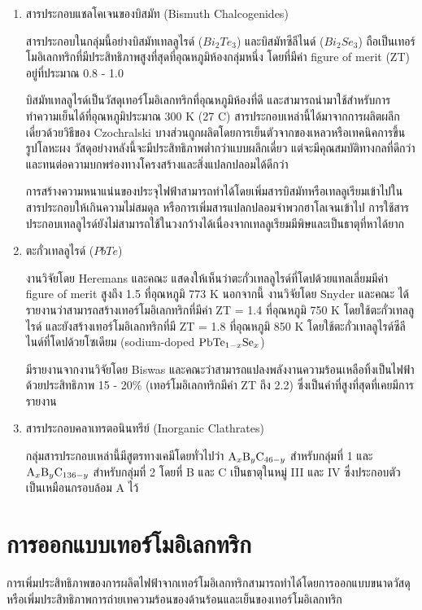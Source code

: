\documentclass[a4paper,nobib,openany,10pt]{tufte-book}
\begin{document}
\begin{enumerate}
\item สารประกอบแชลโคเจนของบิสมัท (Bismuth Chalcogenides)

สารประกอบในกลุ่มนี้อย่างบิสมัทเทลลูไรด์ (\(Bi_2Te_3\))
และบิสมัทซีลีไนด์ (\(Bi_2Se_3\))
ถือเป็นเทอร์โมอิเลกทริกที่มีประสิทธิภาพสูงที่สุดที่อุณหภูมิห้องกลุ่มหนึ่ง
โดยที่มีค่า figure of merit (ZT) อยู่ที่ประมาณ 0.8 - 1.0

บิสมัทเทลลูไรด์เป็นวัสดุเทอร์โมอิเลกทริกที่อุณหภูมิห้องที่ดี
และสามารถนำมาใช้สำหรับการทำความเย็นได้ที่อุณหภูมิประมาณ 300 K (27 C)
สารประกอบเหล่านี้ได้มาจากการผลิตผลึกเดี่ยวด้วยวิธีของ Czochralski
บางส่วนถูกผลิตโดยการเย็นตัวจากของเหลวหรือเทคนิคการขึ้นรูปโลหะผง
วัสดุอย่างหลังนี้จะมีประสิทธิภาพต่ำกว่าแบบผลึกเดี่ยว
แต่จะมีคุณสมบัติทางกลที่ดีกว่าและทนต่อความบกพร่องทางโครงสร้างและสิ่งแปลกปลอมได้ดีกว่า

การสร้างความหนาแน่นของประจุไฟฟ้าสามารถทำได้โดยเพิ่มสารบิสมัทหรือเทลลูเรียมเข้าไปในสารประกอบให้เกินความไม่สมดุล
หรือการเพิ่มสารแปลกปลอมจำพวกฮาโลเจนเข้าไป
การใช้สารประกอบเทลลูไรด์ยังไม่สามารถใช้ในวงกว้างได้เนื่องจากเทลลูเรียมมีพิษและเป็นธาตุที่หาได้ยาก

\item ตะกั่วเทลลูไรด์ (\(PbTe\))

งานวิจัยโดย Heremans และคณะ
แสดงให้เห็นว่าตะกั่วเทลลูไรด์ที่โดปด้วยแทลเลี่ยมมีค่า figure of merit
สูงถึง 1.5 ที่อุณหภูมิ 773 K นอกจากนี้ งานวิจัยโดย Snyder และคณะ
ได้รายงานว่าสามารถสร้างเทอร์โมอิเลกทริกที่มีค่า ZT = 1.4 ที่อุณหภูมิ
750 K โดยใช้ตะกั่วเทลลูไรด์ และยังสร้างเทอร์โมอิเลกทริกที่มี ZT = 1.8
ที่อุณหภูมิ 850 K โดยใช้ตะกั่วเทลลูไรด์ซีลีไนด์ที่โดปด้วยโซเดียม
(sodium-doped \(\ce{PbTe_{1-x}Se_x}\))

มีรายงานจากงานวิจัยโดย Biswas
และคณะว่าสามารถแปลงพลังงานความร้อนเหลือทิ้งเป็นไฟฟ้าด้วยประสิทธิภาพ
15 - 20\% (เทอร์โมอิเลกทริกมีค่า ZT ถึง 2.2)
ซึ่งเป็นค่าที่สูงที่สุดที่เคยมีการรายงาน

\item สารประกอบคลาเทรตอนินทรีย์ (Inorganic Clathrates)

กลุ่มสารประกอบเหล่านี้มีสูตรทางเคมีโดยทั่วไปว่า \(\ce{A_xB_yC_{46-y}}\)
สำหรับกลุ่มที่ 1 และ \(\ce{A_xB_yC_{136-y}}\) สำหรับกลุ่มที่ 2 โดยที่ B
และ C เป็นธาตุในหมู่ III และ IV ซึ่งประกอบตัวเป็นเหมือนกรอบล้อม A ไว้
\end{enumerate}

\section{การออกแบบเทอร์โมอิเลกทริก}
\label{sec:orgbb0fe8b}
การเพิ่มประสิทธิภาพของการผลิตไฟฟ้าจากเทอร์โมอิเลกทริกสามารถทำได้โดยการออกแบบขนาดวัสดุหรือเพิ่มประสิทธิภาพการถ่ายเทความร้อนของด้านร้อนและเย็นของเทอร์โมอิเลกทริก
\end{document}
